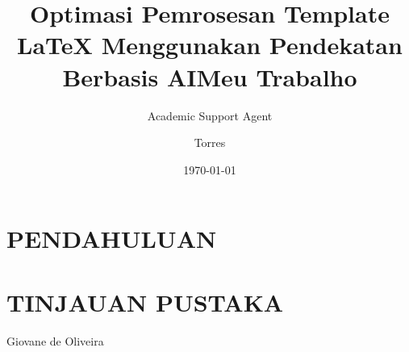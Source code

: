 \documentclass{textsi}
\title{Optimasi Pemrosesan Template LaTeX Menggunakan Pendekatan Berbasis AI}
\author{Academic Support Agent}
\date{\today}
\begin{document}
\maketitle

\begin{abstract}

\end{abstract}

\chapter{PENDAHULUAN}


\chapter{TINJAUAN PUSTAKA}



\usepackage[brazilian]{babel} %
\usepackage[utf8]{inputenc} %
\usepackage[T1]{fontenc} %

\usepackage{array,booktabs}
\usepackage{enumitem}
\usepackage{listings}
\usepackage{makecell}
\usepackage{graphicx,subfigure}
\usepackage{multirow}
\usepackage{xcolor}
\usepackage{pdfpages}
\usepackage{lipsum}

\title{Meu Trabalho}

\author{Torres}{Giovane de Oliveira}




\end{document}
